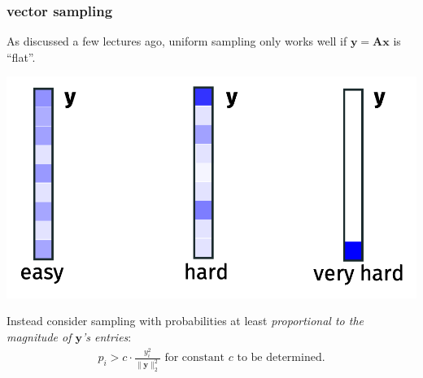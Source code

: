 \documentclass[compress]{beamer}
\newcommand{\bv}[1]{\mathbf{#1}}
\DeclareMathOperator{\Var}{Var}
\begin{document}
\begin{frame}[t]
	\frametitle{vector sampling}
	As discussed a few lectures ago, uniform sampling only works well if $\bv{y} = \bv{A}\bv{x}$ is ``flat''. 
	\vspace{-.5em}
	\begin{center}
		\includegraphics[width=.6\textwidth]{uniform_hard.png}
	\end{center}
	\vspace{-.5em}
	
	Instead consider sampling with probabilities at least \emph{proportional to the magnitude of $\bv{y}$'s entries}:
	\begin{align*}
		p_i > c\cdot \frac{y_i^2}{\|\bv{y}\|_2^2} \text{ for constant $c$ to be determined.}
	\end{align*}
\end{frame}

%	
%	
%
\end{document}
